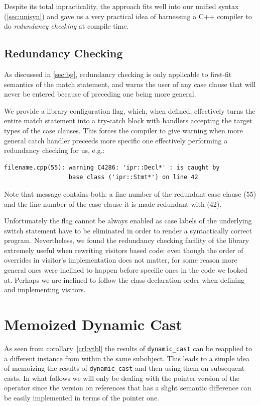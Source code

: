 \documentclass[preprint]{sigplanconf}
\makeatletter
\DeclareRobustCommand{\code}[1]{{\lstinline[breaklines=false,escapechar=@]{#1}}}
\makeatother
\begin{document}
Despite its total inpracticality, the approach fits well into our unified syntax 
(\textsection\ref{sec:unisyn}) and gave us a very practical idea of harnessing a
C++ compiler to do \emph{redundancy checking} at compile time.

\subsection{Redundancy Checking}
\label{sec:redun}

As discussed in \textsection\ref{sec:bg}, redundancy checking is only applicable 
to first-fit semantics of the match statement, and warns the user of any 
case clause that will never be entered because of preceding one being more 
general.

We provide a library-configuration flag, which, when defined, effectively turns 
the entire match statement into a try-catch block with handlers accepting the 
target types of the case clauses. This forces the compiler to give warning when 
more general catch handler preceeds more specific one effectively performing a 
redundancy checking for us, e.g.:

\begin{lstlisting}
filename.cpp(55): warning C4286: 'ipr::Decl*' : is caught by 
                  base class ('ipr::Stmt*') on line 42
\end{lstlisting}

\noindent
Note that message contains both: a line number of the redundant case clause (55) 
and the line number of the case clause it is made redundant with (42).

Unfortunately the flag cannot be always enabled as case labels of the underlying 
switch statement have to be eliminated in order to render a syntactically 
correct program. Nevertheless, we found the redundancy checking facility of the 
library extremely useful when rewriting visitors based code: even though the 
order of overrides in visitor's implementation does not matter, for some reason 
more general ones were inclined to happen before specific ones in the code we 
looked at. Perhaps we are inclined to follow the class declaration order when 
defining and implementing visitors.

\section{Memoized Dynamic Cast}
\label{sec:memcast}

As seen from corollary~\ref{crl:vtbl} the results of \code{dynamic_cast} can be 
reapplied to a different instance from within the same subobject. This leads to 
a simple idea of memoizing the results of \code{dynamic_cast} and then using 
them on subsequent casts. In what follows we will only be dealing with the 
pointer version of the operator since the version on references that has a 
slight semantic difference can be easily implemented in terms of the pointer one.
\end{document}
